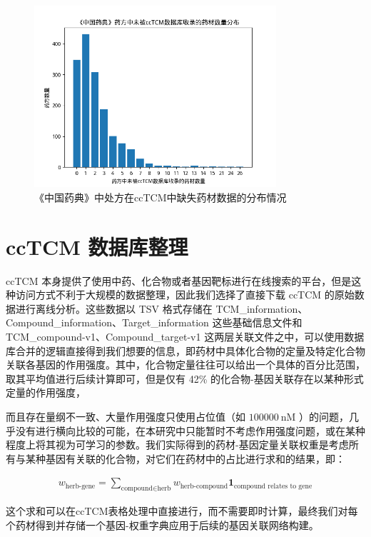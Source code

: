 \begin{figure}[H]
  \centering
  \includegraphics[width=0.8\textwidth]{figures/unlisted_medicinals_distribution.png}
  \caption{《中国药典》中处方在ccTCM中缺失药材数据的分布情况}
  \label{fig:missing_herbs}
\end{figure}

\section{ccTCM 数据库整理}

ccTCM 本身提供了使用中药、化合物或者基因靶标进行在线搜索的平台，但是这种访问方式不利于大规模的数据整理，因此我们选择了直接下载 ccTCM 的原始数据进行离线分析。这些数据以 TSV 格式存储在 {TCM\_information}、{Compound\_information}、{Target\_information} 这些基础信息文件和 {TCM\_compound-v1}、{Compound\_target-v1} 这两层关联文件之中，可以使用数据库合并的逻辑直接得到我们想要的信息，即药材中具体化合物的定量及特定化合物关联各基因的作用强度。其中，化合物定量往往可以给出一个具体的百分比范围，取其平均值进行后续计算即可，但是仅有 42\% 的化合物-基因关联存在以某种形式定量的作用强度，

而且存在量纲不一致、大量作用强度只使用占位值（如 $100000~\mathrm{nM}$ ）的问题，几乎没有进行横向比较的可能，在本研究中只能暂时不考虑作用强度问题，或在某种程度上将其视为可学习的参数。我们实际得到的药材-基因定量关联权重是考虑所有与某种基因有关联的化合物，对它们在药材中的占比进行求和的结果，即：


\begin{align}
w_{\text{herb-gene}} = \sum_{\text{compound} \in \text{herb}} w_{\text{herb-compound}} \mathbf{1}_{\text{compound relates to gene}}
\end{align}

这个求和可以在ccTCM表格处理中直接进行，而不需要即时计算，最终我们对每个药材得到并存储一个基因-权重字典应用于后续的基因关联网络构建。

